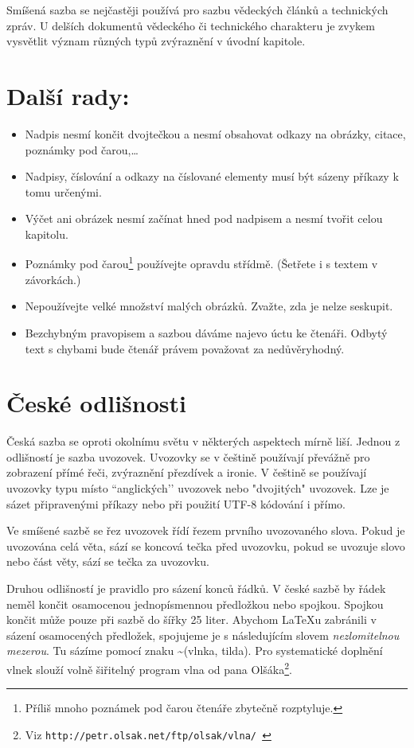 \documentclass[a4paper, 10pt, twocolumn]{article}
\begin{document}
  Smíšená sazba se nejčastěji používá pro sazbu vědeckých článků a technických zpráv. U delších dokumentů vědeckého či technického charakteru je zvykem vysvětlit význam různých typů zvýraznění v úvodní kapitole.
\section{Další rady:}
  \begin{itemize}
    \setlength\itemsep{0.4mm}
    \item Nadpis nesmí končit dvojtečkou a nesmí obsahovat odkazy na obrázky, citace, poznámky pod čarou,\dots
    \item Nadpisy, číslování a odkazy na číslované elementy musí být sázeny příkazy k tomu určenými.
    \item Výčet ani obrázek nesmí začínat hned pod nadpisem a nesmí tvořit celou kapitolu.
    \item Poznámky pod čarou\footnote{Příliš mnoho poznámek pod čarou čtenáře zbytečně rozptyluje.} používejte opravdu střídmě. (Šetřete i s textem v závorkách.)
    \item Nepoužívejte velké množství malých obrázků. Zvažte, zda je nelze seskupit.
    \item Bezchybným pravopisem a sazbou dáváme najevo úctu ke čtenáři. Odbytý text s chybami bude čtenář právem považovat za nedůvěryhodný.
  \end{itemize}
\section{České odlišnosti}
  Česká sazba se oproti okolnímu světu v některých aspektech mírně liší. Jednou z odlišností je sazba uvozovek. Uvozovky se v češtině používají převážně pro zobrazení přímé řeči, zvýraznění přezdívek a ironie. V češtině se používají uvozovky typu  místo ``anglických’’ uvozovek nebo "dvojitých" uvozovek. Lze je sázet připravenými příkazy nebo při použití UTF-8 kódování i přímo.

  Ve smíšené sazbě se řez uvozovek řídí řezem prvního uvozovaného slova. Pokud je uvozována celá věta, sází se koncová tečka před uvozovku, pokud se uvozuje slovo nebo část věty, sází se tečka za uvozovku.

  Druhou odlišností je pravidlo pro sázení konců řádků. V české sazbě by řádek neměl končit osamocenou jednopísmennou předložkou nebo spojkou. Spojkou  končit může pouze při sazbě do šířky 25 liter. Abychom \LaTeX u zabránili v sázení osamocených předložek, spojujeme je s následujícím slovem \textit{nezlomitelnou mezerou}. Tu sázíme pomocí znaku \textasciitilde (vlnka, tilda). Pro systematické doplnění vlnek slouží volně šiřitelný program vlna od pana Olšáka\footnote{Viz \texttt{http://petr.olsak.net/ftp/olsak/vlna/ }}.
\end{document}

